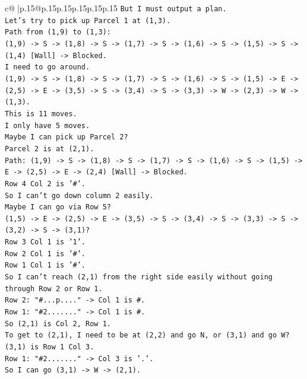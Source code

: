\documentclass{article}
\begin{document}
{\begin{supertabular}{c@{$\;$}|p{.15\linewidth}@{}p{.15\linewidth}p{.15\linewidth}p{.15\linewidth}p{.15\linewidth}p{.15\linewidth}}
{{{\texttt{But I must output a plan.} \\
\texttt{Let's try to pick up Parcel 1 at (1,3).} \\
\texttt{Path from (1,9) to (1,3):} \\
\texttt{(1,9) {-}> S {-}> (1,8) {-}> S {-}> (1,7) {-}> S {-}> (1,6) {-}> S {-}> (1,5) {-}> S {-}> (1,4) {[}Wall{]} {-}> Blocked.} \\
\texttt{I need to go around.} \\
\texttt{(1,9) {-}> S {-}> (1,8) {-}> S {-}> (1,7) {-}> S {-}> (1,6) {-}> S {-}> (1,5) {-}> E {-}> (2,5) {-}> E {-}> (3,5) {-}> S {-}> (3,4) {-}> S {-}> (3,3) {-}> W {-}> (2,3) {-}> W {-}> (1,3).} \\
\texttt{This is 11 moves.} \\
\texttt{I only have 5 moves.} \\
\texttt{Maybe I can pick up Parcel 2?} \\
\texttt{Parcel 2 is at (2,1).} \\
\texttt{Path: (1,9) {-}> S {-}> (1,8) {-}> S {-}> (1,7) {-}> S {-}> (1,6) {-}> S {-}> (1,5) {-}> E {-}> (2,5) {-}> E {-}> (2,4) {[}Wall{]} {-}> Blocked.} \\
\texttt{Row 4 Col 2 is '\#'.} \\
\texttt{So I can't go down column 2 easily.} \\
\texttt{Maybe I can go via Row 5?} \\
\texttt{(1,5) {-}> E {-}> (2,5) {-}> E {-}> (3,5) {-}> S {-}> (3,4) {-}> S {-}> (3,3) {-}> S {-}> (3,2) {-}> S {-}> (3,1)?} \\
\texttt{Row 3 Col 1 is '1'.} \\
\texttt{Row 2 Col 1 is '\#'.} \\
\texttt{Row 1 Col 1 is '\#'.} \\
\texttt{So I can't reach (2,1) from the right side easily without going through Row 2 or Row 1.} \\
\texttt{Row 2: "\#...p...." {-}> Col 1 is \#.} \\
\texttt{Row 1: "\#2......." {-}> Col 1 is \#.} \\
\texttt{So (2,1) is Col 2, Row 1.} \\
\texttt{To get to (2,1), I need to be at (2,2) and go N, or (3,1) and go W?} \\
\texttt{(3,1) is Row 1 Col 3.} \\
\texttt{Row 1: "\#2......." {-}> Col 3 is '.'.} \\
\texttt{So I can go (3,1) {-}> W {-}> (2,1).} \\
}}}
\end{supertabular}}
\end{document}
